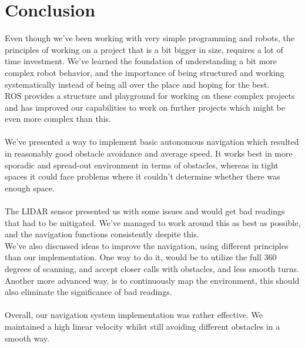 \documentclass[conference]{IEEEtran}
\begin{document}
\section{Conclusion}\label{conclusion}
Even though we've been working with very simple programming and robots, the principles of working on a project 
that is a bit bigger in size, requires a lot of time investment. 
We've learned the foundation of understanding a bit more complex robot behavior, and the importance of 
being structured and working systematically instead of being all over the place and hoping for the best. \\
ROS provides a structure and playground for working on these complex projects and has improved our capabilities 
to work on further projects which might be even more complex than this. \\\\
We've presented a way to implement basic autonomous navigation which resulted in reasonably good obstacle avoidance 
and average speed. It works best in more sporadic and spread-out environment in terms of obstacles, 
whereas in tight spaces it could face problems where it couldn't determine whether there was enough space. \\\\
The LIDAR sensor presented us with some issues and would get bad readings that had to be mitigated. 
We've managed to work around this as best as possible, and the navigation functions consistently despite this. \\
We've also discussed ideas to improve the navigation, using different principles than our implementation. 
One way to do it, would be to utilize the full 360 degrees of scanning, and accept closer calls with obstacles, 
and less smooth turns. Another more advanced way, is to continuously map the environment, this should also eliminate 
the significance of bad readings. \\\\
Overall, our navigation system implementation was rather effective.
We maintained a high linear velocity whilst still avoiding different obstacles in a smooth way. \\
\end{document}
